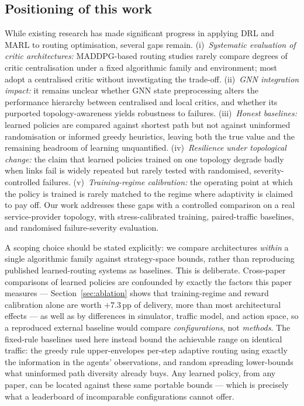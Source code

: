 \documentclass[10pt,journal,comsoc]{IEEEtran}
\begin{document}
\subsection{Positioning of this work}
While existing research has made significant progress in applying DRL and MARL to routing optimisation, several gaps remain. (i)~\emph{Systematic evaluation of critic architectures:} MADDPG-based routing studies rarely compare degrees of critic centralisation under a fixed algorithmic family and environment; most adopt a centralised critic without investigating the trade-off. (ii)~\emph{GNN integration impact:} it remains unclear whether GNN state preprocessing alters the performance hierarchy between centralised and local critics, and whether its purported topology-awareness yields robustness to failures. (iii)~\emph{Honest baselines:} learned policies are compared against shortest path but not against uninformed randomisation or informed greedy heuristics, leaving both the true value and the remaining headroom of learning unquantified. (iv)~\emph{Resilience under topological change:} the claim that learned policies trained on one topology degrade badly when links fail is widely repeated but rarely tested with randomised, severity-controlled failures. (v)~\emph{Training-regime calibration:} the operating point at which the policy is trained is rarely matched to the regime where adaptivity is claimed to pay off. Our work addresses these gaps with a controlled comparison on a real service-provider topology, with stress-calibrated training, paired-traffic baselines, and randomised failure-severity evaluation.

A scoping choice should be stated explicitly: we compare architectures \emph{within} a single algorithmic family against strategy-space bounds, rather than reproducing published learned-routing systems as baselines. This is deliberate. Cross-paper comparisons of learned policies are confounded by exactly the factors this paper measures --- Section~\ref{sec:ablation} shows that training-regime and reward calibration alone are worth $+7.3$\,pp of delivery, more than most architectural effects --- as well as by differences in simulator, traffic model, and action space, so a reproduced external baseline would compare \emph{configurations}, not \emph{methods}. The fixed-rule baselines used here instead bound the achievable range on identical traffic: the greedy rule upper-envelopes per-step adaptive routing using exactly the information in the agents' observations, and random spreading lower-bounds what uninformed path diversity already buys. Any learned policy, from any paper, can be located against these same portable bounds --- which is precisely what a leaderboard of incomparable configurations cannot offer.
\end{document}
